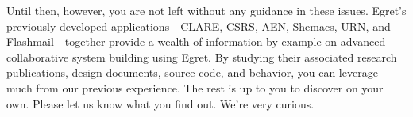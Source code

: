 Until then, however, you are not left without any guidance in these 
issues.  Egret's previously developed applications---CLARE, CSRS, 
AEN, Shemacs, URN, and Flashmail---together provide a wealth of 
information by example on advanced collaborative system building using
Egret.  By studying their associated research publications, design
documents, source code, and behavior, you can leverage much from
our previous experience.  The rest is up to you to discover on your
own.  Please let us know what you find out. We're very curious.








